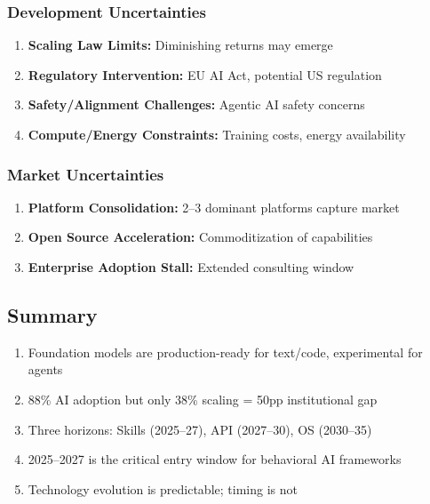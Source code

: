 \subsubsection{Development Uncertainties}

\begin{enumerate}
    \item \textbf{Scaling Law Limits:} Diminishing returns may emerge
    \item \textbf{Regulatory Intervention:} EU AI Act, potential US regulation
    \item \textbf{Safety/Alignment Challenges:} Agentic AI safety concerns
    \item \textbf{Compute/Energy Constraints:} Training costs, energy availability
\end{enumerate}

\subsubsection{Market Uncertainties}

\begin{enumerate}
    \item \textbf{Platform Consolidation:} 2--3 dominant platforms capture market
    \item \textbf{Open Source Acceleration:} Commoditization of capabilities
    \item \textbf{Enterprise Adoption Stall:} Extended consulting window
\end{enumerate}


\subsection{Summary}

\begin{tcolorbox}[colback=gray!5!white, colframe=gray!75!black,
    title=\textbf{Summary: Appendix UNMAPPED_VVV.0 Key Points}]

\begin{enumerate}
    \item Foundation models are production-ready for text/code, experimental for agents
    \item 88\% AI adoption but only 38\% scaling = 50pp institutional gap
    \item Three horizons: Skills (2025--27), API (2027--30), OS (2030--35)
    \item 2025--2027 is the critical entry window for behavioral AI frameworks
    \item Technology evolution is predictable; timing is not
\end{enumerate}

\end{tcolorbox}

